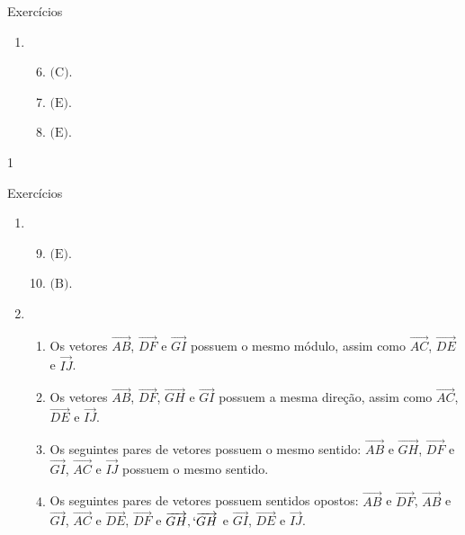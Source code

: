 \begin{answer}{Exercícios}
{\exerciselist
\begin{enumerate}
\item 
\begin{enumerate}\setcounter{enumii}{5}
\item {} 
\(\text{(C)}\).

\item {} 
\(\text{(E)}\).

\item {} 
\(\text{(E)}\).
\end{enumerate}
\end{enumerate}
}{1}
\end{answer}
\clearmargin

\begin{answer}{Exercícios}
{\exerciselist
\begin{enumerate}
\item 
\begin{enumerate}\setcounter{enumii}{8}
\item {} 
\(\text{(E)}\).

\item {} 
\(\text{(B)}\).
\end{enumerate}

\item
\begin{enumerate}
\item {} 
Os vetores \(\overrightarrow{AB}\), \(\overrightarrow{DF}\) e \(\overrightarrow{GI}\) possuem o mesmo módulo, assim como \(\overrightarrow{AC}\), \(\overrightarrow{DE}\) e \(\overrightarrow{IJ}\).

\item {} 
Os vetores \(\overrightarrow{AB}\), \(\overrightarrow{DF}\), \(\overrightarrow{GH}\) e \(\overrightarrow{GI}\) possuem a mesma direção, assim como \(\overrightarrow{AC}\), \(\overrightarrow{DE}\) e \(\overrightarrow{IJ}\).

\item {} 
Os seguintes pares de vetores possuem o mesmo sentido: \(\overrightarrow{AB}\) e \(\overrightarrow{GH}\), \(\overrightarrow{DF}\) e \(\overrightarrow{GI}\), \(\overrightarrow{AC}\) e \(\overrightarrow{IJ}\) possuem o mesmo sentido.

\item {} 
Os seguintes pares de vetores possuem sentidos opostos: \(\overrightarrow{AB}\) e \(\overrightarrow{DF}\), \(\overrightarrow{AB}\) e \(\overrightarrow{GI}\), \(\overrightarrow{AC}\) e \(\overrightarrow{DE}\), \(\overrightarrow{DF}\) e \(\overrightarrow{GH}, `\overrightarrow{GH}\) e \(\overrightarrow{GI}\), \(\overrightarrow{DE}\) e \(\overrightarrow{IJ}\).


\end{enumerate}
\end{enumerate}}
\end{answer}
